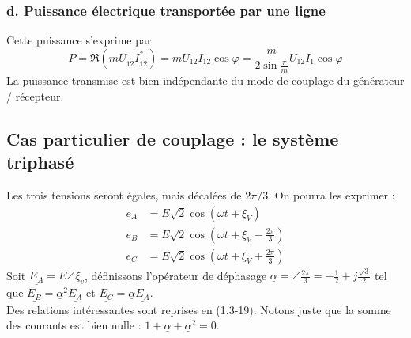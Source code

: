 \subsubsection{d. Puissance électrique transportée par une ligne}
Cette puissance s'exprime par 
\begin{equation}
	P = \Re(m\underline{U}_{12}\underline{I}_{12}^*) = mU_{12}I_{12}\cos
	\varphi = \frac{m}{2\sin\frac{\pi}{m}}U_{12}I_1\cos\varphi
\end{equation}
La puissance transmise est bien indépendante du mode de couplage du 
générateur / récepteur.
		
\subsection{Cas particulier de couplage : le système triphasé}
Les trois tensions seront égales, mais décalées de $2\pi/3$. On pourra 
les exprimer :
\begin{equation}
	\begin{array}{ll}
		e_A & = E\sqrt{2}\cos(\omega t +\xi_V)                  \\
		e_B & = E\sqrt{2}\cos(\omega t +\xi_V - \frac{2\pi}{3}) \\
		e_C & = E\sqrt{2}\cos(\omega t +\xi_V + \frac{2\pi}{3}) 
	\end{array}
\end{equation}
Soit $\underline{E_A}=E \angle \xi_v$, définissons l'opérateur de déphasage $\underline{\alpha} = \angle \frac{2
	\pi}{3} = -\frac{1}{2}+j\frac{\sqrt{3}}{2}$ tel que $\underline{E_B} = 
\underline{\alpha}^2\underline{E_A}$ et $\underline{E_C} = \underline{\alpha}
\underline{E_A}$.\\
Des relations intéressantes sont reprises en (1.3-19). Notons juste que 
la somme des courants est bien nulle : $1+\underline{\alpha}+\underline{
	\alpha}^2 = 0$.
		
